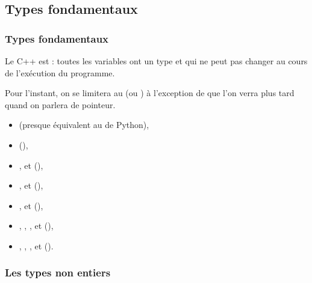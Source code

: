 \documentclass{cppcourses}
\begin{document}
\subsection{Types fondamentaux}

\begin{frame}

\frametitle{Types fondamentaux}

Le C++ est  : toutes les variables ont un type et qui ne peut pas changer au cours de l'exécution du programme.

Pour l'instant, on se limitera au  (ou ) à l'exception de  que l'on verra plus tard quand on parlera de pointeur.


\begin{itemize}
     \item<2->  (presque équivalent au  de Python),
     \item<3->  (),
     \item<4-> ,  et  (),
     \item<5-> ,  et  (),
     \item<6-> ,  et  (),
     \item<7-> , , ,  et  (),
     \item<8-> , , ,  et  ().
\end{itemize}

\end{frame}

\subsubsection{Les types non entiers}
\end{document}
